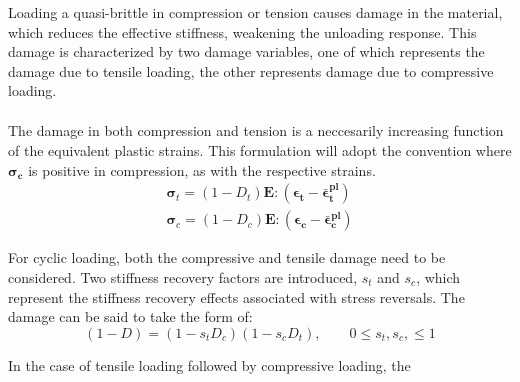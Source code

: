 Loading a quasi-brittle in compression or tension causes damage in
the material, which reduces the effective stiffness, weakening the
unloading response. This damage is characterized by two damage variables,
one of which represents the damage due to tensile loading, the other
represents damage due to compressive loading. 
\begin{equation}
\begin{aligned}
\end{aligned}
\label{eqn:dam2}
\end{equation}


The damage in both compression and tension is a neccesarily increasing
function of the equivalent plastic strains. This formulation will
adopt the convention where $\boldsymbol{\mathbf{\sigma}_{c}}$ is
positive in compression, as with the respective strains. 
\begin{equation}
\begin{aligned}
\boldsymbol{\sigma}_{t}=(1-D_{t})\mathbf{E}:(\boldsymbol{\epsilon_{t}}-\boldsymbol{\bar{\epsilon}_{t}^{pl}})\\
\boldsymbol{\sigma}_{c}=(1-D_{c})\mathbf{E}:(\boldsymbol{\epsilon_{c}}-\boldsymbol{\bar{\epsilon}_{c}^{pl}})
\end{aligned}
\label{eqn:dam3}
\end{equation}


For cyclic loading, both the compressive and tensile damage need to
be considered. Two stiffness recovery factors are introduced, $s_{t}$
and $s_{c}$, which represent the stiffness recovery effects associated
with stress reversals. The damage can be said to take the form of:
\begin{equation}
(1-D)=(1-s_{t}D_{c})(1-s_{c}D_{t}),\qquad0\leq s_{t},s_{c},\leq1\label{eqn:dam4}
\end{equation}


In the case of tensile loading followed by compressive loading, the
